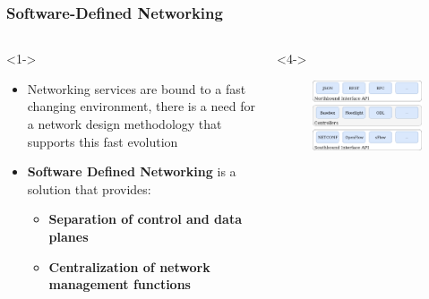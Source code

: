 \documentclass[aspectratio=43]{beamer}
\begin{document}
\begin{frame}
\frametitle{Software-Defined Networking}

\begin{columns}
\begin{column}{0.5\textwidth}<1->
\begin{itemize}
    \item Networking services are bound to a fast changing environment, there is a need for a network design methodology that supports this
            fast evolution
    \item<1->\textbf{Software Defined Networking} is a solution that provides:
    \begin{itemize}
        \item<2->\textbf{Separation of control and data planes} 
        \item<3->\textbf{Centralization of network management functions}
    \end{itemize}
\end{itemize}
\end{column}

\begin{column}{0.5\textwidth}<4->
  \begin{figure}
      \centering
      \includegraphics[width=1\textwidth]{sdn/sdn_controller_arch}
  \end{figure}
\end{column}
\end{columns}
\end{frame}
\end{document}
